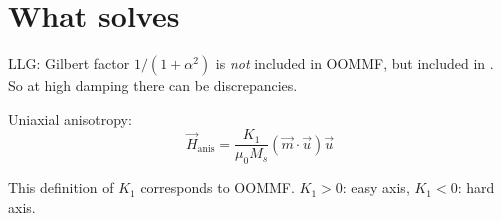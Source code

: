 \section{What \mumax solves}

LLG: Gilbert factor $1/(1+\alpha^2)$ is \emph{not} included in OOMMF, but included in \mumax. So at high damping there can be discrepancies.

Uniaxial anisotropy:
\begin{equation}
	\vec{H}_\mathrm{anis} = \frac{K_1}{\mu_0 M_s} (\vec{m} \cdot \vec{u}) \vec{u}
\end{equation}

This definition of $K_1$ corresponds to OOMMF. $K_1 > 0$: easy axis, $K_1 < 0$: hard axis.
